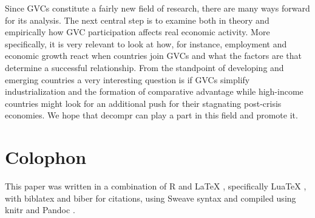 \documentclass[a4paper]{article}\usepackage[]{graphicx}\usepackage[]{color}
\begin{document}
Since GVCs constitute a fairly new field of research, there are many
ways forward for its analysis. The next central step is to examine
both in theory and empirically how GVC participation affects real
economic activity. More specifically, it is very relevant to look
at how, for instance, employment and economic growth react when countries
join GVCs and what the factors are that determine a successful relationship.
From the standpoint of developing and emerging countries a very interesting
question is if GVCs simplify industrialization and the formation of
comparative advantage while high-income countries might look for an
additional push for their stagnating post-crisis economies. We hope
that decompr can play a part in this field and promote it.

\nocite{wickham2014advanced} 

\vfill{}


\section*{Colophon}

This paper was written in a combination of R \citep{core2014r} and
\LaTeX{} \citep{lamport1986document}, specifically Lua\TeX{} \citealt{hagen2005luatex},
with biblatex and biber \citep{lehman2006biblatex} for citations,
using Sweave syntax \citep{leisch2003sweave} and compiled using knitr
\citep{yihui2013knitr} and Pandoc \citep{macfarlane2012pandoc}.

\newpage{}

\printbibliography
\end{document}

